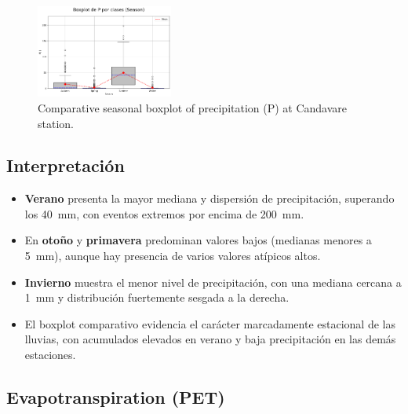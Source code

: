 \vspace{0.2cm}

\begin{figure}[H]
\centering
\includegraphics[width=0.4\textwidth]{resultados/por_estacion_del_anio/boxplot_clases_por_estacion/Candavare/P_ClassBoxplot_Season.png}
\caption{Comparative seasonal boxplot of precipitation (P) at Candavare station.}
\label{fig:candavare_p_box}
\end{figure}

\subsection*{Interpretación}

\begin{itemize}
    \item \textbf{Verano} presenta la mayor mediana y dispersión de precipitación, superando los 40~mm, con eventos extremos por encima de 200~mm.
    \item En \textbf{otoño} y \textbf{primavera} predominan valores bajos (medianas menores a 5~mm), aunque hay presencia de varios valores atípicos altos.
    \item \textbf{Invierno} muestra el menor nivel de precipitación, con una mediana cercana a 1~mm y distribución fuertemente sesgada a la derecha.
    \item El boxplot comparativo evidencia el carácter marcadamente estacional de las lluvias, con acumulados elevados en verano y baja precipitación en las demás estaciones.
\end{itemize}

\subsection{Evapotranspiration (PET)}

